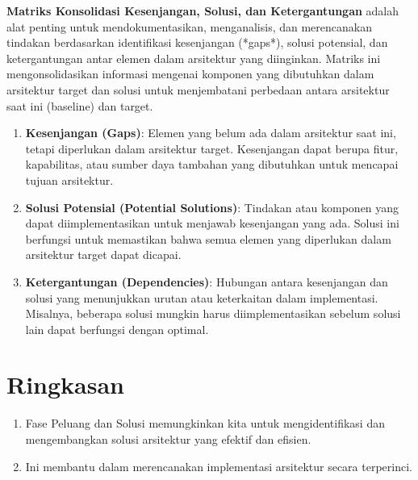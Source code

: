 \textbf{Matriks Konsolidasi Kesenjangan, Solusi, dan Ketergantungan} adalah alat penting untuk mendokumentasikan, menganalisis, dan merencanakan tindakan berdasarkan identifikasi kesenjangan (*gaps*), solusi potensial, dan ketergantungan antar elemen dalam arsitektur yang diinginkan. Matriks ini mengonsolidasikan informasi mengenai komponen yang dibutuhkan dalam arsitektur target dan solusi untuk menjembatani perbedaan antara arsitektur saat ini (baseline) dan target.

\begin{enumerate}
	\item \textbf{Kesenjangan (Gaps)}: Elemen yang belum ada dalam arsitektur saat ini, tetapi diperlukan dalam arsitektur target. Kesenjangan dapat berupa fitur, kapabilitas, atau sumber daya tambahan yang dibutuhkan untuk mencapai tujuan arsitektur.
	
	\item \textbf{Solusi Potensial (Potential Solutions)}: Tindakan atau komponen yang dapat diimplementasikan untuk menjawab kesenjangan yang ada. Solusi ini berfungsi untuk memastikan bahwa semua elemen yang diperlukan dalam arsitektur target dapat dicapai.
	
	\item \textbf{Ketergantungan (Dependencies)}: Hubungan antara kesenjangan dan solusi yang menunjukkan urutan atau keterkaitan dalam implementasi. Misalnya, beberapa solusi mungkin harus diimplementasikan sebelum solusi lain dapat berfungsi dengan optimal.
\end{enumerate}

\section{Ringkasan}
\begin{enumerate}
	\item Fase Peluang dan Solusi memungkinkan kita untuk mengidentifikasi dan mengembangkan solusi arsitektur yang efektif dan efisien.
	\item Ini membantu dalam merencanakan implementasi arsitektur secara terperinci.
\end{enumerate}
